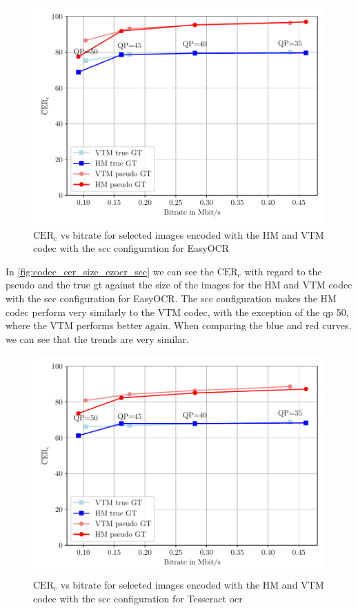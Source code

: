 \begin{figure}[h!]
    \centering
    \includegraphics[width=\textwidth]{../images/analyze/codec_cer_size_ezocr_scc.pdf}
    \caption{$\text{CER}_{\text{c}}$ vs bitrate for selected images encoded with the HM and VTM codec with the \gls{scc} configuration for EasyOCR}
    \label{fig:codec_cer_size_ezocr_scc}
\end{figure}

In \autoref{fig:codec_cer_size_ezocr_scc} we can see the $\text{CER}_{\text{c}}$ with regard to the pseudo and the true \gls{gt} against the size of the images for the HM and VTM codec with the \gls{scc} configuration for EasyOCR.
The \gls{scc} configuration makes the HM codec perform very similarly to the VTM codec, with the exception of the \gls{qp} 50, where the VTM performs better again.
When comparing the blue and red curves, we can see that the trends are very similar.


\begin{figure}[h!]
    \centering
    \includegraphics[width=\textwidth]{../images/analyze/codec_cer_size_tess_scc.pdf}
    \caption{$\text{CER}_{\text{c}}$ vs bitrate for selected images encoded with the HM and VTM codec with the \gls{scc} configuration for Tesseract \gls{ocr}}
    \label{fig:codec_cer_size_tess_scc}
\end{figure}


